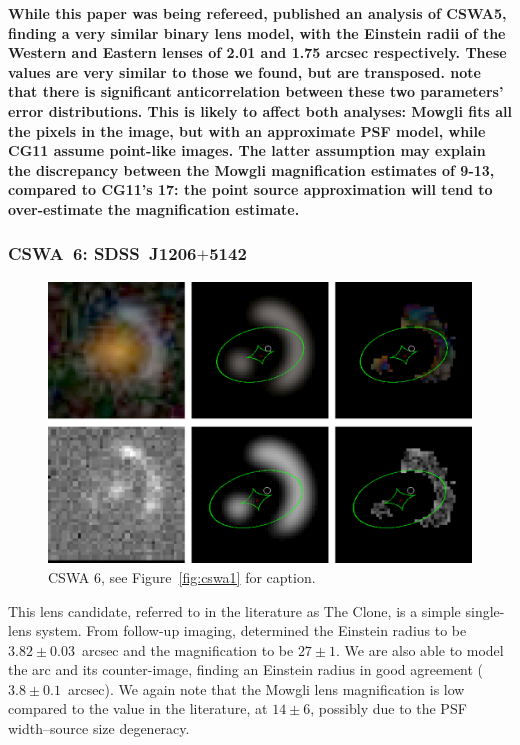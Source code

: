 \documentclass[iop]{emulateapj}
\def\theapplet{{\sc Mowgli}\xspace}
\def\NEW#1{{\bf{#1}}}
\begin{document}
\NEW{While this paper was being refereed, \citet[][CG11]{C+G11} published an
analysis of CSWA5, finding a very similar binary lens model, with the Einstein
radii of the Western and Eastern lenses of 2.01 and 1.75 arcsec respectively.
These values are very similar to those we found, but are transposed.
\citet{C+G11} note that there is significant anticorrelation between these two
parameters' error distributions. This is likely to affect both analyses:
\theapplet fits all the pixels in the image, but with an approximate PSF
model, while CG11 assume point-like images. The latter assumption may explain
the discrepancy between the \theapplet magnification estimates of 9-13,
compared to CG11's 17: the point source approximation will tend to
over-estimate the magnification estimate.}



\subsubsection*{CSWA~6: SDSS\ J1206$+$5142}
\label{sec:results:indinotes:cswa6}


\begin{figure}[!ht]
	\centering\includegraphics[width=\linewidth]{figs/6.eps}
	\caption{CSWA 6, see Figure~\ref{fig:cswa1} for caption.}
	\label{fig:cswa6}
\end{figure}

This lens candidate, referred to in the literature  as The Clone, is a simple
single-lens system. From follow-up imaging,  \citet{Lin++09} determined the
Einstein radius to be $3.82 \pm 0.03$~arcsec and the magnification to be $27 \pm
1$. We are also able to model the arc and its counter-image, finding an Einstein
radius in good agreement ($3.8\pm0.1$~arcsec). We again note that the \theapplet
lens magnification is low compared to the value in the literature, at $14\pm6$,
possibly due to the PSF width--source size degeneracy.
\end{document}
